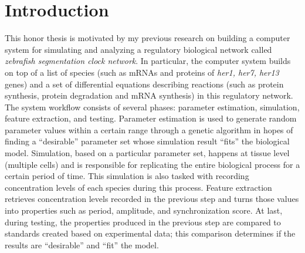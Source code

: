 \documentclass[../thesis.tex]{subfiles}
\begin{document}
\chapter{Introduction}
\label{ch:intro}
This honor thesis is motivated by my previous research on building a computer system for simulating and analyzing a regulatory biological network called \textit{zebrafish segmentation clock network}. In particular, the computer system builds on top of a list of species (such as mRNAs and proteins of \textit{her1, her7, her13} genes) and a set of differential equations describing reactions (such as protein synthesis, protein degradation and mRNA synthesis) in this regulatory network. The system workflow consists of several phases: parameter estimation, simulation, feature extraction, and testing. Parameter estimation is used to generate random parameter values within a certain range through a genetic algorithm in hopes of finding a ``desirable'' parameter set whose simulation result ``fits'' the biological model. Simulation, based on a particular parameter set, happens at tissue level (multiple cells) and is responsible for replicating the entire biological process for a certain period of time. This simulation is also tasked with recording concentration levels of each species during this process. Feature extraction retrieves concentration levels recorded in the previous step and turns those values into properties such as period, amplitude, and synchronization score. At last, during testing, the properties produced in the previous step are compared to standards created based on experimental data; this comparison determines if the results are ``desirable'' and ``fit'' the model. 
\end{document}
